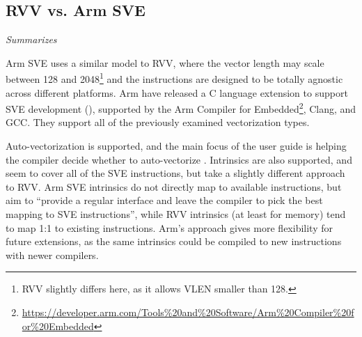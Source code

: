 \documentclass[../thesis]{subfiles}
\begin{document}


\pagebreak
\subsection{RVV vs. Arm SVE}\label{chap:soft:compiling:armsve}
\emph{Summarizes \cite{armltdArmCompilerScalable2019}}

Arm SVE uses a similar model to RVV, where the vector length may scale between 128 and 2048\footnote{RVV slightly differs here, as it allows VLEN smaller than 128.} and the instructions are designed to be totally agnostic across different platforms\cite{stephensARMScalableVector2017}.
Arm have released a C language extension to support SVE development (\cite{armltdARMLanguageExtensions2020}), supported by the Arm Compiler for Embedded\footnote{\url{https://developer.arm.com/Tools\%20and\%20Software/Arm\%20Compiler\%20for\%20Embedded}}, Clang, and GCC.
They support all of the previously examined vectorization types.

Auto-vectorization is supported, and the main focus of the user guide is helping the compiler decide whether to auto-vectorize \cite{armltdArmCompilerScalable2019}.
Intrinsics are also supported, and seem to cover all of the SVE instructions, but take a slightly different approach to RVV.
Arm SVE intrinsics do not directly map to available instructions, but aim to \enquote{provide a regular interface and leave the compiler to pick the best mapping to SVE instructions}, while RVV intrinsics (at least for memory) tend to map 1:1 to existing instructions.
Arm's approach gives more flexibility for future extensions, as the same intrinsics could be compiled to new instructions with newer compilers.
\end{document}
